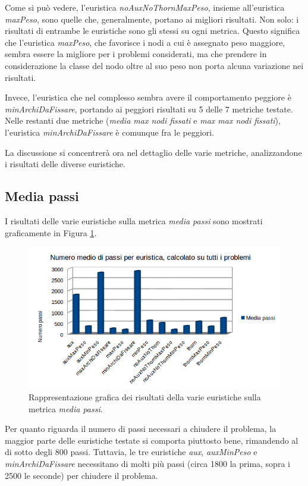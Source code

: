 Come si può vedere, l'euristica \textit{noAuxNoThornMaxPeso}, insieme all'euristica \textit{maxPeso}, sono quelle che, generalmente, portano ai migliori risultati. Non solo: i risultati di entrambe le euristiche sono gli stessi su ogni metrica. Questo significa che l'euristica \textit{maxPeso}, che favorisce i nodi a cui è assegnato peso maggiore, sembra essere la migliore per i problemi considerati, ma che prendere in considerazione la classe del nodo oltre al suo peso non porta alcuna variazione nei risultati.

Invece, l'euristica che nel complesso sembra avere il comportamento peggiore è \textit{minArchiDaFissare}, portando ai peggiori risultati su 5 delle 7 metriche testate. Nelle restanti due metriche (\textit{media max nodi fissati} e \textit{max max nodi fissati}), l'euristica \textit{minArchiDaFissare} è comunque fra le peggiori.

La discussione si concentrerà ora nel dettaglio delle varie metriche, analizzandone i risultati delle diverse euristiche.

\subsection{Media passi}
\label{subsec:mediaPassi}
I risultati delle varie euristiche sulla metrica \textit{media passi} sono mostrati graficamente in Figura \ref{fig:mediaPassi}.

\begin{figure}[H]
\includegraphics[width=\textwidth]{res/img/mediaPassi.png}
\caption{Rappresentazione grafica dei risultati della varie euristiche sulla metrica \textit{media passi}.}
\label{fig:mediaPassi}
\end{figure}

Per quanto riguarda il numero di passi necessari a chiudere il problema, la maggior parte delle euristiche testate si comporta piuttosto bene, rimandendo al di sotto degli 800 passi. Tuttavia, le tre euristiche \textit{aux}, \textit{auxMinPeso} e \textit{minArchiDaFissare} necessitano di molti più passi (circa 1800 la prima, sopra i 2500 le seconde) per chiudere il problema.

